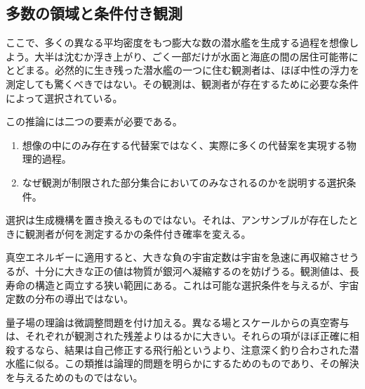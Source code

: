 \begin{classroomqa}
\end{classroomqa}

\subsection{多数の領域と条件付き観測}

ここで、多くの異なる平均密度をもつ膨大な数の潜水艦を生成する過程を想像しよう。大半は沈むか浮き上がり、ごく一部だけが水面と海底の間の居住可能帯にとどまる。必然的に生き残った潜水艦の一つに住む観測者は、ほぼ中性の浮力を測定しても驚くべきではない。その観測は、観測者が存在するために必要な条件によって選択されている。

この推論には二つの要素が必要である。
\begin{enumerate}
\item 想像の中にのみ存在する代替案ではなく、実際に多くの代替案を実現する物理的過程。
\item なぜ観測が制限された部分集合においてのみなされるのかを説明する選択条件。
\end{enumerate}
選択は生成機構を置き換えるものではない。それは、アンサンブルが存在したときに観測者が何を測定するかの条件付き確率を変える。

\begin{classroomqa}
\end{classroomqa}

真空エネルギーに適用すると、大きな負の宇宙定数は宇宙を急速に再収縮させうるが、十分に大きな正の値は物質が銀河へ凝縮するのを妨げうる。観測値は、長寿命の構造と両立する狭い範囲にある。これは可能な選択条件を与えるが、宇宙定数の分布の導出ではない。

量子場の理論は微調整問題を付け加える。異なる場とスケールからの真空寄与は、それぞれが観測された残差よりはるかに大きい。それらの項がほぼ正確に相殺するなら、結果は自己修正する飛行船というより、注意深く釣り合わされた潜水艦に似る。この類推は論理的問題を明らかにするためのものであり、その解決を与えるためのものではない。

